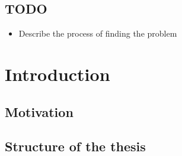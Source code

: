 
\thispagestyle{empty}


\subsection{TODO}

\begin{itemize}
  \item Describe the process of finding the problem
\end{itemize}



\section{Introduction}

\subsection{Motivation}

\subsection{Structure of the thesis}
